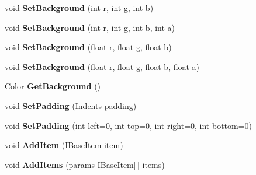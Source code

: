 \begin{DoxyCompactItemize}
void {\bfseries Set\+Background} (int r, int g, int b)
\item 
\mbox{\label{class_space_v_i_l_1_1_window_layout_af89bbb3b46585a8e8f1468ab0421ab2e}} 
void {\bfseries Set\+Background} (int r, int g, int b, int a)
\item 
\mbox{\label{class_space_v_i_l_1_1_window_layout_a511d10188154a364aaa32749e408708e}} 
void {\bfseries Set\+Background} (float r, float g, float b)
\item 
\mbox{\label{class_space_v_i_l_1_1_window_layout_a7b08682a56d5034c9a9cf575667d0275}} 
void {\bfseries Set\+Background} (float r, float g, float b, float a)
\item 
\mbox{\label{class_space_v_i_l_1_1_window_layout_a9e01f322dddc3a2a8ba1fc81f180810d}} 
Color {\bfseries Get\+Background} ()
\item 
\mbox{\label{class_space_v_i_l_1_1_window_layout_a6cf0e14f24eec970de1b2e635cad3698}} 
void {\bfseries Set\+Padding} (\mbox{\hyperlink{struct_space_v_i_l_1_1_decorations_1_1_indents}{Indents}} padding)
\item 
\mbox{\label{class_space_v_i_l_1_1_window_layout_ae08245e87a3f6c33c991df42ed74a256}} 
void {\bfseries Set\+Padding} (int left=0, int top=0, int right=0, int bottom=0)
\item 
\mbox{\label{class_space_v_i_l_1_1_window_layout_aaa12165b9e788fa6a3c8f4bcd2c45878}} 
void {\bfseries Add\+Item} (\mbox{\hyperlink{interface_space_v_i_l_1_1_core_1_1_i_base_item}{I\+Base\+Item}} item)
\item 
\mbox{\label{class_space_v_i_l_1_1_window_layout_a69ea03d6a085cefcd836767b628b7d0f}} 
void {\bfseries Add\+Items} (params \mbox{\hyperlink{interface_space_v_i_l_1_1_core_1_1_i_base_item}{I\+Base\+Item}}\mbox{[}$\,$\mbox{]} items)
\item 
\mbox{\label{class_space_v_i_l_1_1_window_layout_a170e7969d999f88abfa994f80aad2dfc}} 

\end{DoxyCompactItemize}

